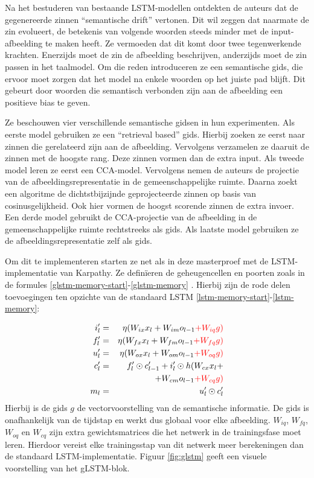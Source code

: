 Na het bestuderen van bestaande LSTM-modellen ontdekten de auteurs dat de gegenereerde zinnen ``semantische drift'' vertonen. Dit wil zeggen dat naarmate de zin evolueert, de betekenis van volgende woorden steeds minder met de input-afbeelding te maken heeft. Ze vermoeden dat dit komt door twee tegenwerkende krachten. Enerzijds moet de zin de afbeelding beschrijven, anderzijds moet de zin passen in het taalmodel. Om die reden introduceren ze een semantische gids, die ervoor moet zorgen dat het model na enkele woorden op het juiste pad blijft. Dit gebeurt door woorden die semantisch verbonden zijn aan de afbeelding een positieve bias te geven.

Ze beschouwen vier verschillende semantische gidsen in hun experimenten. Als eerste model gebruiken ze een ``retrieval based'' gids. Hierbij zoeken ze eerst naar zinnen die gerelateerd zijn aan de afbeelding. Vervolgens verzamelen ze daaruit de zinnen met de hoogste rang. Deze zinnen vormen dan de extra input.
Als tweede model leren ze eerst een CCA-model. Vervolgens nemen de auteurs de projectie van de afbeeldingsrepresentatie in de gemeenschappelijke ruimte. Daarna zoekt een algoritme de dichtstbijzijnde geprojecteerde zinnen op basis van cosinusgelijkheid. Ook hier vormen de hoogst scorende zinnen de extra invoer.
Een derde model gebruikt de CCA-projectie van de afbeelding in de gemeenschappelijke ruimte rechtstreeks als gids.
Als laatste model gebruiken ze de afbeeldingsrepresentatie zelf als gids.

Om dit te implementeren starten ze net als in deze masterproef met de LSTM-implementatie van Karpathy. Ze defin\"ieren de geheugencellen en poorten zoals in de formules \eqref{glstm-memory-start}-\eqref{glstm-memory} . Hierbij zijn de rode delen toevoegingen ten opzichte van de standaard LSTM \eqref{lstm-memory-start}-\eqref{lstm-memory}:

%
\begin{eqnarray}
\vspace{-3mm}
\label{glstm-memory-start}
i_l' & = & \eta (W_{ix} x_l + W_{im} o_{l-1} \color{red}{+ W_{iq} g}) \label{glstm-input} \\
f_l' & = & \eta (W_{fx} x_l + W_{fm} o_{l-1} \color{red}{+ W_{fq} g}) \\
u_l' & = & \eta (W_{ox} x_l + W_{om} o_{l-1} \color{red}{+ W_{oq} g}) \\
c_l' & = & f_l' \odot c_{l-1}' + i_l' \odot h(W_{cx} x_l + \nonumber \\
&   & + W_{cm} o_{l-1} \color{red}{+ W_{cq} g}) \\
m_l & = & u_l' \odot c_l'
\label{glstm-memory}
\vspace{-3mm}
\end{eqnarray}
Hierbij is de gids $g$ de vectorvoorstelling van de semantische informatie. De gids is onafhankelijk van de tijdstap en werkt dus globaal voor elke afbeelding. $W_{iq}$, $W_{fq}$, $W_{oq}$ en $W_{cq}$ zijn extra gewichtsmatrices die het netwerk in de trainingsfase moet leren. Hierdoor vereist elke trainingsstap van dit netwerk meer berekeningen dan de standaard LSTM-implementatie. Figuur \ref{fig:glstm} geeft een visuele voorstelling van het gLSTM-blok.

